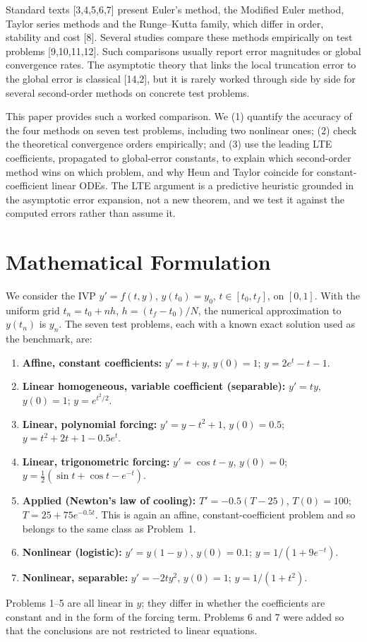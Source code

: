 \documentclass[10pt,letterpaper]{article}
\begin{document}
Standard texts [3,4,5,6,7] present Euler's method, the Modified Euler method, Taylor series methods and the Runge--Kutta family, which differ in order, stability and cost [8]. Several studies compare these methods empirically on test problems [9,10,11,12]. Such comparisons usually report error magnitudes or global convergence rates. The asymptotic theory that links the local truncation error to the global error is classical [14,2], but it is rarely worked through side by side for several second-order methods on concrete test problems.

This paper provides such a worked comparison. We (1) quantify the accuracy of the four methods on seven test problems, including two nonlinear ones; (2) check the theoretical convergence orders empirically; and (3) use the leading LTE coefficients, propagated to global-error constants, to explain which second-order method wins on which problem, and why Heun and Taylor coincide for constant-coefficient linear ODEs. The LTE argument is a predictive heuristic grounded in the asymptotic error expansion, not a new theorem, and we test it against the computed errors rather than assume it.

\section{Mathematical Formulation}
We consider the IVP $y'=f(t,y)$, $y(t_0)=y_0$, $t\in[t_0,t_f]$, on $[0,1]$. With the uniform grid $t_n=t_0+nh$, $h=(t_f-t_0)/N$, the numerical approximation to $y(t_n)$ is $y_n$. The seven test problems, each with a known exact solution used as the benchmark, are:
\begin{enumerate}
\item \textbf{Affine, constant coefficients:} $y'=t+y$, $y(0)=1$; $y=2e^{t}-t-1$.
\item \textbf{Linear homogeneous, variable coefficient (separable):} $y'=ty$, $y(0)=1$; $y=e^{t^2/2}$.
\item \textbf{Linear, polynomial forcing:} $y'=y-t^2+1$, $y(0)=0.5$; $y=t^2+2t+1-0.5e^{t}$.
\item \textbf{Linear, trigonometric forcing:} $y'=\cos t-y$, $y(0)=0$; $y=\tfrac12(\sin t+\cos t-e^{-t})$.
\item \textbf{Applied (Newton's law of cooling):} $T'=-0.5(T-25)$, $T(0)=100$; $T=25+75e^{-0.5t}$. This is again an affine, constant-coefficient problem and so belongs to the same class as Problem~1.
\item \textbf{Nonlinear (logistic):} $y'=y(1-y)$, $y(0)=0.1$; $y=1/(1+9e^{-t})$.
\item \textbf{Nonlinear, separable:} $y'=-2ty^2$, $y(0)=1$; $y=1/(1+t^2)$.
\end{enumerate}
Problems 1--5 are all linear in $y$; they differ in whether the coefficients are constant and in the form of the forcing term. Problems 6 and 7 were added so that the conclusions are not restricted to linear equations.
\end{document}
